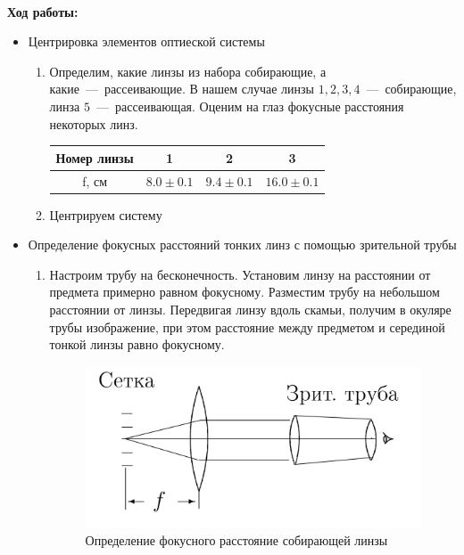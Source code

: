 \documentclass[a4paper, 12pt]{article}
\begin{document}
    \textbf{\\Ход работы:}

    \begin{itemize}
        \item Центрировка элементов оптиеской системы
            \begin{enumerate}
                \item Определим, какие линзы из набора собирающие, а какие~---~рассеивающие. В нашем случае линзы $1, 2, 3, 4$~---~собирающие, линза $5$~---~рассеивающая. Оценим на глаз фокусные расстояния некоторых линз.\\
                
                    \begin{tabular}{|c|c|c|c|} \hline
                        Номер линзы & 1 & 2 & 3 \\ \hline
                        f, см & $8.0 \pm 0.1$ & $9.4 \pm 0.1$ & $16.0 \pm 0.1$ \\ \hline
                    \end{tabular}

                \item Центрируем систему
            \end{enumerate}

        \item Определение фокусных расстояний тонких линз с помощью зрительной трубы
            \begin{enumerate}
                \item Настроим трубу на бесконечность. Установим линзу на расстоянии от предмета примерно равном фокусному. Разместим трубу на небольшом расстоянии от линзы. Передвигая линзу вдоль скамьи, получим в окуляре трубы изображение, при этом расстояние между предметом и серединой тонкой линзы равно фокусному.
                
                \begin{figure}[!h]
                    \centering
                    \includegraphics[scale = 0.3]{412-1.png}
                    \caption{Определение фокусного расстояние собирающей линзы}
                    \label{pic1}
                \end{figure}


\end{enumerate}
\end{itemize}
\end{document}
